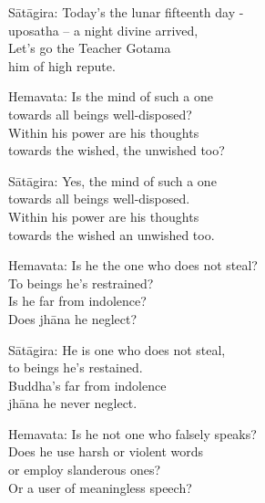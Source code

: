 \begin{MyDescription}{S\=at\=agira:}
Today's the lunar fifteenth day - \\
uposatha – a night divine arrived,\\
Let's go the Teacher Gotama\\
him of high repute.
\end{MyDescription}   

\begin{MyDescription}{Hemavata:}
Is the mind of such a one\\
towards all beings well-disposed?\\
Within his power are his thoughts\\
towards the wished, the unwished too?
\end{MyDescription}   

\begin{MyDescription}{S\=at\=agira:}
Yes, the mind of such a one\\
towards all beings well-disposed.\\
Within his power are his thoughts\\
towards the wished an unwished too.
\end{MyDescription}   

\begin{MyDescription}{Hemavata:}
Is he the one who does not steal?\\
To beings he's restrained?\\
Is he far from indolence?\\
Does jh\=ana he neglect?
\end{MyDescription}   

\begin{MyDescription}{S\=at\=agira:}
He is one who does not steal,\\
to beings he's restained.\\
Buddha's far from indolence\\
jh\=ana he never neglect.
\end{MyDescription}   

\begin{MyDescription}{Hemavata:}
Is he not one who falsely speaks?\\
Does he use harsh or violent words\\
or employ slanderous ones?\\
Or a user of meaningless speech?
\end{MyDescription}   

